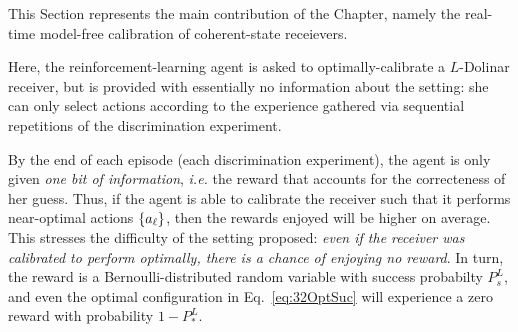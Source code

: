 This Section represents the main contribution of the Chapter, namely the real-time model-free calibration of coherent-state receievers.

Here, the reinforcement-learning agent is asked to optimally-calibrate a $L$-Dolinar receiver, but is provided  with essentially no information about the setting: she can only select actions according to the experience gathered via sequential repetitions of the discrimination experiment.

By the end of each episode (each discrimination experiment), the agent is only given \textit{one bit of information}, \textit{i.e.} the reward that accounts for the correcteness of her guess. Thus, if the agent is able to calibrate the receiver such that it performs near-optimal actions $\lbrace a_\ell\rbrace$, then the rewards enjoyed will be higher on average. This stresses the difficulty of the setting proposed: \textit{even if the receiver was calibrated to perform optimally, there is a chance of enjoying no reward}. In turn, the reward is a Bernoulli-distributed random variable with success probabilty $P_s^{L}$, and even the optimal configuration in Eq.~\ref{eq:32OptSuc} will experience a zero reward with probability $1-P_*^{L}$.

